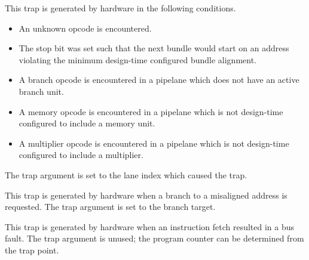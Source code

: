 
This trap is generated by hardware in the following conditions.

\begin{itemize}

\item An unknown opcode is encountered.

\item The stop bit was set such that the next bundle would start on an address
violating the minimum design-time configured bundle alignment.

\item A branch opcode is encountered in a pipelane which does not have an active
branch unit.

\item A memory opcode is encountered in a pipelane which is not design-time
configured to include a memory unit.

\item A multiplier opcode is encountered in a pipelane which is not design-time
configured to include a multiplier.

\end{itemize}

\noindent The trap argument is set to the lane index which caused the trap.



This trap is generated by hardware when a branch to a misaligned address is
requested. The trap argument is set to the branch target.



This trap is generated by hardware when an instruction fetch resulted in a bus
fault. The trap argument is unused; the program counter can be determined from
the trap point.



